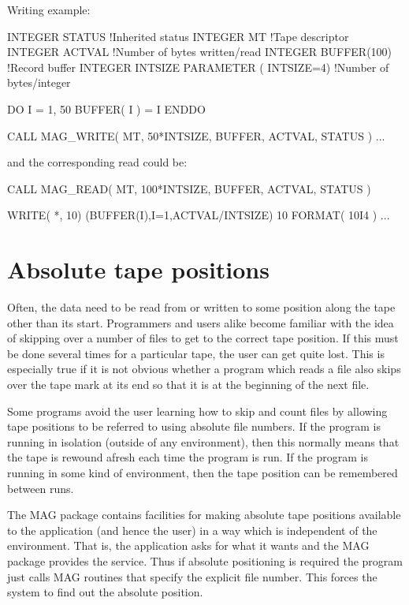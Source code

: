 \documentclass[11pt]{starlink}
\begin{document}
Writing example:
\begin{small}
\begin{terminalv}
INTEGER STATUS              !Inherited status
INTEGER MT                  !Tape descriptor
INTEGER ACTVAL              !Number of bytes written/read
INTEGER BUFFER(100)         !Record buffer
INTEGER INTSIZE
PARAMETER ( INTSIZE=4)      !Number of bytes/integer

DO I = 1, 50
  BUFFER( I ) = I
ENDDO

CALL MAG_WRITE( MT, 50*INTSIZE, BUFFER, ACTVAL, STATUS )
...
\end{terminalv}
\end{small}
and the corresponding read could be:
\begin{small}
\begin{terminalv}
      CALL MAG_READ( MT, 100*INTSIZE, BUFFER, ACTVAL, STATUS )

      WRITE( *, 10) (BUFFER(I),I=1,ACTVAL/INTSIZE)
10    FORMAT( 10I4 )
         ...
\end{terminalv}
\end{small}

\section{\label{positions}Absolute tape positions}
Often, the data need to be read from or written to some position along
the tape other than its start. Programmers and users alike become
familiar with the idea of skipping over a number of files to get to
the correct tape position. If this must be done several times for a
particular tape, the user can get quite lost. This is especially true
if it is not obvious whether a program which reads a file also skips
over the tape mark at its end so that it is at the beginning of the next
file.

Some programs avoid the user learning how to skip and count files by
allowing tape positions to be referred to using absolute file numbers.
If the program is running in isolation (outside of any environment),
then this normally means that the tape is rewound afresh each time the
program is run. If the program is running in some kind of environment,
then the tape position can be remembered between runs.

The MAG package contains facilities for making absolute tape positions
available to the application (and hence the user) in a  way which is
independent of the environment. That is, the application asks for what
it wants and the MAG package provides the service. Thus if absolute
positioning is required the program just calls MAG routines that
specify the explicit file number. This forces the system to find
out the absolute position.
\end{document}
